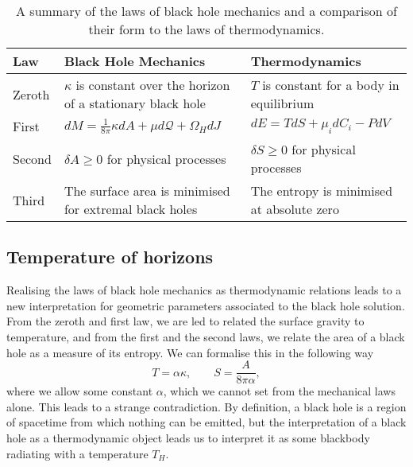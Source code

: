 \begin{table}[h!]
\centering
\def\arraystretch{1.3}
\begin{tabular}{|p{1.5cm}|p{5.5cm}|p{5.5cm}|}
\hline
{Law}    & {Black Hole Mechanics}                                             & {Thermodynamics}                                                \\ \hline \hline
Zeroth & $\kappa$ is constant over the horizon of a stationary black hole & $T$ is constant for a body in equilibrium                     \\ \hline 
First  & $dM = \frac{1}{8\pi} \kappa dA + \mu d\mathcal{Q} + \Omega_H dJ$ & $dE = T dS + \mu_i dC_i - P dV$   \\ \hline
Second & $\delta A \geq 0$  for physical processes                                               & $\delta S \geq 0$ for physical processes                                            \\ \hline
Third  & The surface area is minimised for extremal black holes           & The entropy is minimised at absolute zero \\ \hline
\end{tabular}
\caption[Comparison of the laws of black hole mechanics and thermodynamics]{A summary of the laws of black hole mechanics and a comparison of their form to the laws of thermodynamics.}
\label{table:laws}
\end{table}

\subsection{Temperature of horizons}
\label{sec:bhtemperature}
Realising the laws of black hole mechanics as thermodynamic relations leads to a new interpretation for geometric parameters associated to the black hole solution. From the zeroth and first law, we are led to related the surface gravity to temperature, and from the first and the second laws, we relate the area of a black hole as a measure of its entropy. We can formalise this in the following way
\begin{equation*}
	T = \alpha \kappa, \qquad S = \frac{A}{8 \pi \alpha},
\end{equation*}
where we allow some constant $\alpha$, which we cannot set from the mechanical laws alone. This leads to a strange contradiction. By definition, a black hole is a region of spacetime from which nothing can be emitted, but the interpretation of a black hole as a thermodynamic object leads us to interpret it as some blackbody radiating with a temperature $T_H$. 

